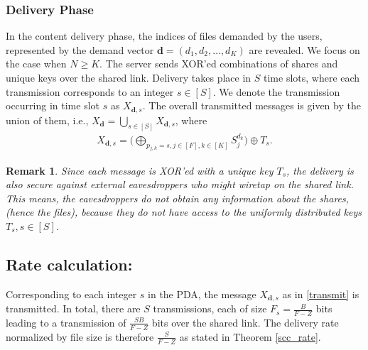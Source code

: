 \documentclass[conference]{IEEEtran}
\newtheorem{rem}{Remark}
\begin{document}
\subsubsection{Delivery Phase}
In the content delivery phase, the indices of files demanded by the users, represented by the demand vector $\mathbf{d}=(d_1, d_2,\ldots,d_K)$ are revealed. We focus on the case when $N\geq K$. The server sends XOR'ed combinations of shares and unique keys over the shared link. Delivery takes place in $S$ time slots, where each transmission corresponds to an integer $s\in [S]$. We denote the transmission occurring in time slot $s$ as $X_{\mathbf{d},s}$. The overall transmitted messages is given by the union of them, i.e., $X_{\mathbf{d}}=\bigcup_{s\in [S]} X_{\mathbf{d},s}$, where
\begin{align}\label{transmit}
X_{\mathbf{d},s}=\Big(\bigoplus_{p_{j,k}=s, j\in[F], k\in[K]}S^{d_k}_j\Big)\oplus T_s.   
\end{align}
\begin{rem}
	Since each message is XOR'ed with a unique key $T_s$, the delivery is also secure against external eavesdroppers who might wiretap on the shared link. This means, the eavesdroppers do not obtain any information about the shares, (hence the files), because they do not have access to the uniformly distributed keys $T_s, s\in [S]$. 
\end{rem}
\subsection{Rate calculation:}\label{pda_rate}
Corresponding to each integer $s$ in the PDA, the message $X_{\mathbf{d},s}$ as in \eqref{transmit} is transmitted. In total, there are $S$ transmissions, each of size $F_s=\frac{B}{F-Z}$ bits leading to a transmission of $\frac{SB}{F-Z}$ bits over the shared link. The delivery rate normalized by file size is therefore $\frac{S}{F-Z}$ as stated in Theorem \ref{scc_rate}.
\end{document}
